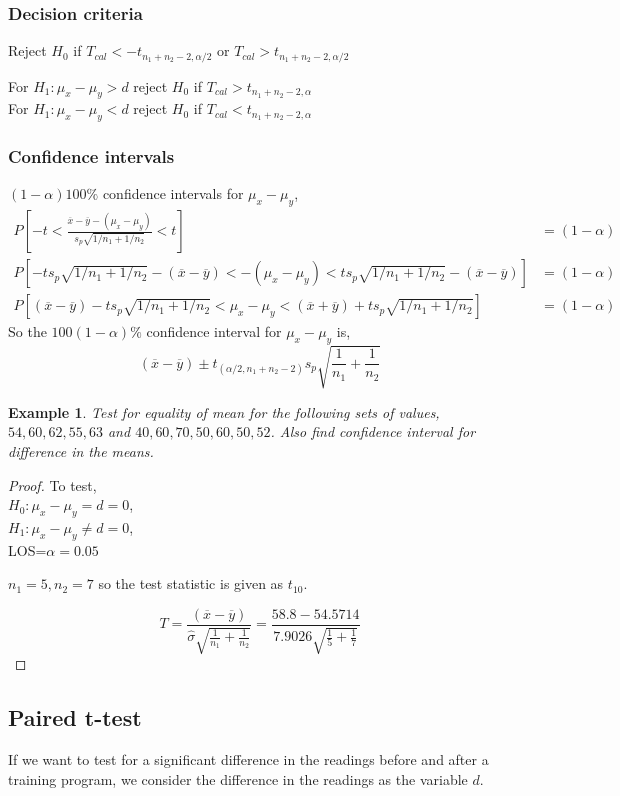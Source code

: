 \documentclass[oneside,11pt,pdftex]{book}%
\numberwithin{equation}{section}
\newtheorem{example}[theorem]{Example}
\numberwithin{section}{chapter}
\numberwithin{equation}{chapter}
\begin{document}
\subsubsection{Decision criteria}
Reject $ H_0 $ if $ T_{cal} < -t_{n_1+n_2-2,\alpha/2}$ or $ T_{cal}>t_{n_1+n_2-2,\alpha/2} $


For $ H_1: \mu_x-\mu_y>d $ reject $ H_0 $ if $ T_{cal} >t_{n_1+n_2-2,\alpha}$\\
For $ H_1: \mu_x-\mu_y<d $ reject $ H_0 $ if $ T_{cal} <t_{n_1+n_2-2,\alpha}$

\subsubsection{Confidence intervals}
$ (1-\alpha)100\% $ confidence intervals for $ \mu_x-\mu_y $,
\begin{align*}
	P\left[-t < \frac{\overline{x}-\overline{y}-(\mu_x-\mu_y)}{s_p \sqrt{1/n_1+1/n_2}}<t\right]&=(1-\alpha)\\
	P\left[-t s_p \sqrt{1/n_1+1/n_2}-(\overline{x}-\overline{y}) < -(\mu_x-\mu_y) < t s_p \sqrt{1/n_1+1/n_2}-(\overline{x}-\overline{y})\right]&=(1-\alpha)\\
	P\left[(\overline{x}-\overline{y})-t s_p \sqrt{1/n_1+1/n_2} < \mu_x-\mu_y < (\overline{x}+\overline{y})+t s_p \sqrt{1/n_1+1/n_2}\right]&=(1-\alpha)
\end{align*}
So the $ 100(1-\alpha)\% $ confidence interval for $ \mu_x-\mu_y  $ is,
\[ (\overline{x}-\overline{y})\pm t_{(\alpha/2, n_1+n_2-2)}s_p \sqrt{\frac{1}{n_1}+\frac{1}{n_2}} \]


\begin{example}
	Test for equality of mean for the following sets of values,
	$ 54, 60, 62, 55, 63 $ and $ 40, 60, 70, 50, 60, 50, 52 $. Also find confidence interval for difference in the means.
\end{example}
\begin{proof}
	To test,\\
	$ H_0:\mu_x-\mu_y=d=0$,\\
	$ H_1:\mu_x - \mu_y \neq d=0 $,\\
	LOS=$ \alpha=0.05 $
	
	
	$ n_1=5, n_2=7 $ so the test statistic is given as $ t_{10} $.
	
	\[ T=\frac{(\overline{x}-\overline{y})}{\hat{\sigma}\sqrt{\frac{1}{n_1}+\frac{1}{n_2}}} = \frac{58.8-54.5714}{7.9026 \sqrt{\frac{1}{5}+\frac{1}{7}}}\]
\end{proof}

\subsection{Paired t-test}
If we want to test for a significant difference in the readings before and after a training program, we consider the difference in the readings as the variable $ d $.
\end{document}

